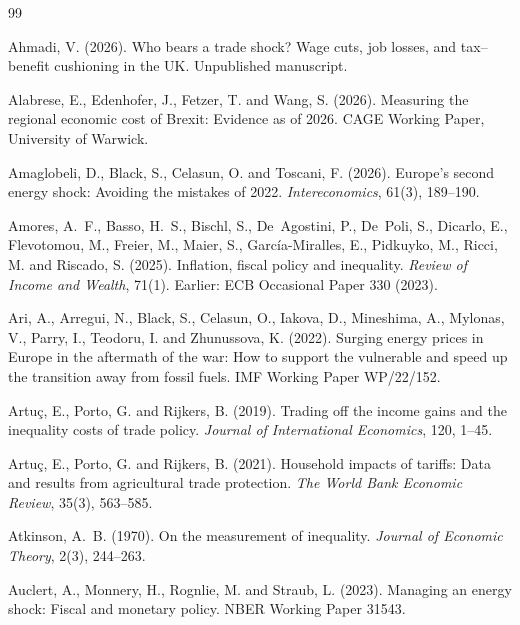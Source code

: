 \begingroup\sloppy
\begin{thebibliography}{99}

Ahmadi, V. (2026).
\newblock Who bears a trade shock? Wage cuts, job losses, and tax--benefit cushioning in the UK.
\newblock Unpublished manuscript.

Alabrese, E., Edenhofer, J., Fetzer, T. and Wang, S. (2026).
\newblock Measuring the regional economic cost of Brexit: Evidence as of 2026.
\newblock CAGE Working Paper, University of Warwick.

Amaglobeli, D., Black, S., Celasun, O. and Toscani, F. (2026).
\newblock Europe's second energy shock: Avoiding the mistakes of 2022.
\newblock \emph{Intereconomics}, 61(3), 189--190.

Amores, A.~F., Basso, H.~S., Bischl, S., De~Agostini, P., De~Poli, S., Dicarlo, E., Flevotomou, M., Freier, M., Maier, S., Garc\'ia-Miralles, E., Pidkuyko, M., Ricci, M. and Riscado, S. (2025).
\newblock Inflation, fiscal policy and inequality.
\newblock \emph{Review of Income and Wealth}, 71(1). Earlier: ECB Occasional Paper 330 (2023).

Ari, A., Arregui, N., Black, S., Celasun, O., Iakova, D., Mineshima, A., Mylonas, V., Parry, I., Teodoru, I. and Zhunussova, K. (2022).
\newblock Surging energy prices in Europe in the aftermath of the war: How to support the vulnerable and speed up the transition away from fossil fuels.
\newblock IMF Working Paper WP/22/152.

Artu\c{c}, E., Porto, G. and Rijkers, B. (2019).
\newblock Trading off the income gains and the inequality costs of trade policy.
\newblock \emph{Journal of International Economics}, 120, 1--45.

Artu\c{c}, E., Porto, G. and Rijkers, B. (2021).
\newblock Household impacts of tariffs: Data and results from agricultural trade protection.
\newblock \emph{The World Bank Economic Review}, 35(3), 563--585.

Atkinson, A.~B. (1970).
\newblock On the measurement of inequality.
\newblock \emph{Journal of Economic Theory}, 2(3), 244--263.

Auclert, A., Monnery, H., Rognlie, M. and Straub, L. (2023).
\newblock Managing an energy shock: Fiscal and monetary policy.
\newblock NBER Working Paper 31543.


\end{thebibliography}
